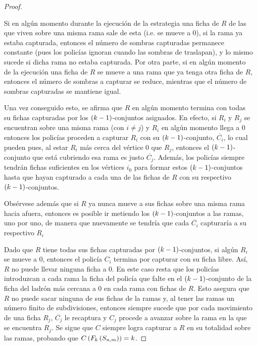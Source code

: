 \begin{proof}
\begin{enumerate}
            Si en alg\'un momento durante la ejecuci\'on de la estrategia una
            ficha de $R$ de las que viven sobre una misma rama sale de esta
            (i.e. se mueve a $0$), si la rama ya estaba capturada, entonces el
            n\'umero de sombras capturadas permanece constante (pues los
            polic\'ias ignoran cuando las sombras de traslapan), y lo mismo
            sucede si dicha rama no estaba capturada. Por otra parte, si en
            alg\'un momento de la ejecuci\'on una ficha de $R$ se mueve a una
            rama que ya tenga otra ficha de $R$, entonces el n\'umero de sombras
            a capturar se reduce, mientras que el n\'umero de sombras capturadas
            se mantiene igual.

            Una vez conseguido esto, se afirma que $R$ en alg\'un momento
            termina con todas su fichas capturadas por los
            $\left( k-1\right)$-conjuntos asignados. En efecto, si $R_i$ y $R_j$ se
            encuentran sobre una misma rama (con $i\neq j$) y $R_i$ en alg\'un
            momento llega a $0$ entonces los polic\'ias proceden a capturar
            $R_i$ con su $\left( k-1\right)$-conjunto, $\overline{C_i}$, lo cual
            pueden pues, al estar $R_i$ m\'as cerca del v\'ertice $0$ que $R_j$,
            entonces el $\left( k-1\right)$-conjunto que est\'a cubriendo esa rama es
            justo $\overline{C_j}$. Adem\'as, los polic\'ias siempre tendr\'an
            fichas suficientes en los v\'ertices $i_0$ para formar estos
            $\left( k-1\right)$-conjuntos hasta que hayan capturado a cada una de las
            fichas de $R$ con su respectivo $\left( k-1\right)$-conjuntos.
            
            Obs\'ervese adem\'as que si $R$ ya nunca mueve a sus fichas sobre
            una misma rama hacia afuera, entonces es posible ir metiendo los
            $\left( k-1\right)$-conjuntos a las ramas, uno por uno, de manera que
            nuevamente se tendr\'ia que cada $\overline{C_i}$ capturar\'ia a su
            respectivo $R_i$
        \end{enumerate}

        Dado que $R$ tiene todas sus fichas capturadas por
        $\left( k-1\right)$-conjuntos, si alg\'un $R_i$ se mueve a $0$, entonces el
        polic\'ia $C_i$ termina por capturar con su ficha libre. As\'i, $R$ no
        puede llevar ninguna ficha a $0$. En este caso resta que los polic\'ias
        introduzcan a cada rama la ficha del polic\'ia que falte en el
        $\left( k-1\right)$-conjunto de la ficha del ladr\'on m\'as cercana a $0$ en
        cada rama con fichas de $R$. Esto asegura que $R$ no puede sacar ninguna
        de sus fichas de la ramas y, al tener las ramas un n\'umero finito de
        subdivisiones, entonces siempre sucede que por cada movimiento de una
        ficha $R_j$, $\overline{C_j}$ le recaptura y $C_j$ procede a avanzar
        sobre la rama en la que se encuentra $R_j$. Se sigue que $C$ siempre
        logra capturar a $R$ en su totalidad sobre las ramas, probando que
        $C\left( F_k\left( S_{n,m}\right)\right)=k$.
        
        \end{proof}